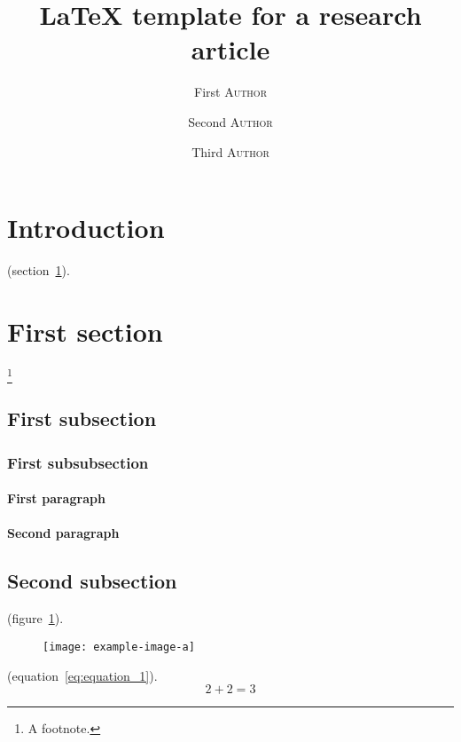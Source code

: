 \documentclass[]{tiponnaer}
\title{\LaTeX{} template for a research article}
\author[1,2]{First {\scshape Author}}
\author[1]{Second {\scshape Author}}
\author[2]{Third {\scshape Author}}
\affil[1]{First affiliation}
\affil[2]{Second affiliation}
\begin{document}
\maketitle

\section*{Introduction}
\label{sec:introduction}

	\lipsum[1-4] (section~\ref{sec:fusce}).

\section{First section}
\label{sec:fusce}
	
	\lipsum[1][1-3]\footnote{A footnote.}
	
	\subsection{First subsection}

		\subsubsection{First subsubsection}

			\paragraph{First paragraph}

				\lipsum[1]

			\paragraph{Second paragraph}

				\lipsum[2]

	\subsection{Second subsection}
	
	\lipsum[1] (figure~\ref{fig:figure_1}).
\begin{figure}
	\centering
	\texttt{[image: example-image-a]} 
	\caption{\lipsum[1][1-2]}
	\label{fig:figure_1}
\end{figure}

	\lipsum[2] (equation~\ref{eq:equation_1}).
\begin{equation}
	2 + 2 = 3
	\label{eq:equation_1}
\end{equation}
\end{document}
